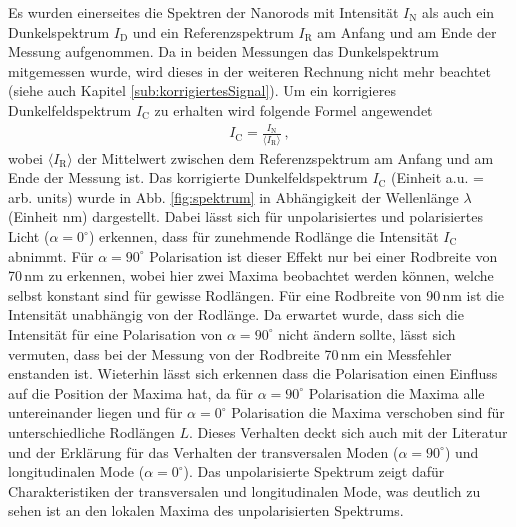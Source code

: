Es wurden einerseites die Spektren der Nanorods mit Intensität $I_\mathrm{N}$ als auch ein Dunkelspektrum $I_\mathrm{D}$ und ein Referenzspektrum $I_\mathrm{R}$ am Anfang und am Ende der Messung aufgenommen. Da in beiden Messungen das Dunkelspektrum mitgemessen wurde, wird dieses in der weiteren Rechnung nicht mehr beachtet (siehe auch Kapitel \ref{sub:korrigiertesSignal}). Um ein korrigieres Dunkelfeldspektrum $I_\mathrm{C}$ zu erhalten wird folgende Formel angewendet
\begin{gather}
    I_\mathrm{C} = \frac{I_\mathrm{N}}{\langle I_\mathrm{R} \rangle} ~,
\end{gather}
wobei $\langle I_\mathrm{R} \rangle$ der Mittelwert zwischen dem Referenzspektrum am Anfang und am Ende der Messung ist. Das korrigierte Dunkelfeldspektrum $I_\mathrm{C}$ (Einheit a.u. = arb. units) wurde in Abb. \ref{fig:spektrum} in Abhängigkeit der Wellenlänge $\lambda$ (Einheit nm) dargestellt. Dabei lässt sich für unpolarisiertes und polarisiertes Licht ($\alpha = 0^\circ$) erkennen, dass für zunehmende Rodlänge die Intensität $I_\mathrm{C}$ abnimmt. Für $\alpha = 90^\circ$ Polarisation ist dieser Effekt nur bei einer Rodbreite von 70\,nm zu erkennen, wobei hier zwei Maxima beobachtet werden können, welche selbst konstant sind für gewisse Rodlängen. Für eine Rodbreite von 90\,nm ist die Intensität unabhängig von der Rodlänge. Da erwartet wurde, dass sich die Intensität für eine Polarisation von $\alpha = 90^\circ$ nicht ändern sollte, lässt sich vermuten, dass bei der Messung von der Rodbreite 70\,nm ein Messfehler enstanden ist. Wieterhin lässt sich erkennen dass die Polarisation einen Einfluss auf die Position der Maxima hat, da für $\alpha = 90^\circ$ Polarisation die Maxima alle untereinander liegen und für $\alpha = 0^\circ$ Polarisation die Maxima verschoben sind für unterschiedliche Rodlängen $L$. Dieses Verhalten deckt sich auch mit der Literatur  und der Erklärung für das Verhalten der transversalen Moden ($\alpha = 90^\circ$) und longitudinalen Mode ($\alpha = 0^\circ$). Das unpolarisierte Spektrum zeigt dafür Charakteristiken der transversalen und longitudinalen Mode, was deutlich zu sehen ist an den lokalen Maxima des unpolarisierten Spektrums.  
\bigskip

